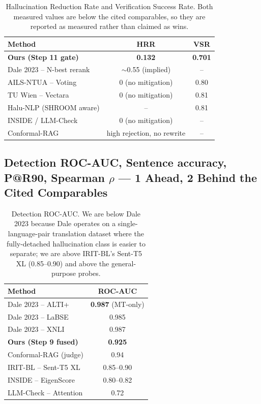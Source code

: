 \begin{table}[ht]
\centering
\small
\begin{tabular}{lcc}
\hline
\textbf{Method} & \textbf{HRR} & \textbf{VSR} \\
\hline
\textbf{Ours (Step 11 gate)} & \textbf{0.132} & \textbf{0.701} \\
Dale 2023 -- N-best rerank & $\sim$0.55 (implied) & -- \\
AILS-NTUA -- Voting & 0 (no mitigation) & 0.80 \\
TU Wien -- Vectara & 0 (no mitigation) & 0.81 \\
Halu-NLP (SHROOM aware) & -- & 0.81 \\
INSIDE / LLM-Check & 0 (no mitigation) & -- \\
Conformal-RAG & high rejection, no rewrite & -- \\
\hline
\end{tabular}
\caption{Hallucination Reduction Rate and Verification Success Rate. Both
measured values are below the cited comparables, so they are reported as
measured rather than claimed as wins.}
\label{tab:hrr-vsr}
\end{table}

\subsection{Detection ROC-AUC, Sentence accuracy, P@R90, Spearman $\rho$ --- 1 Ahead, 2 Behind the Cited Comparables}
\label{sec:detection-atpar}

\begin{table}[ht]
\centering
\small
\begin{tabular}{lc}
\hline
\textbf{Method} & \textbf{ROC-AUC} \\
\hline
Dale 2023 -- ALTI+ & \textbf{0.987} (MT-only) \\
Dale 2023 -- LaBSE & 0.985 \\
Dale 2023 -- XNLI & 0.987 \\
\textbf{Ours (Step 9 fused)} & \textbf{0.925} \\
Conformal-RAG (judge) & 0.94 \\
IRIT-BL -- Sent-T5 XL & 0.85--0.90 \\
INSIDE -- EigenScore & 0.80--0.82 \\
LLM-Check -- Attention & 0.72 \\
\hline
\end{tabular}
\caption{Detection ROC-AUC. We are below Dale 2023 because Dale operates
on a single-language-pair translation dataset where the fully-detached
hallucination class is easier to separate; we are above IRIT-BL's
Sent-T5 XL (0.85--0.90) and above the general-purpose probes.}
\label{tab:roc-auc}
\end{table}

